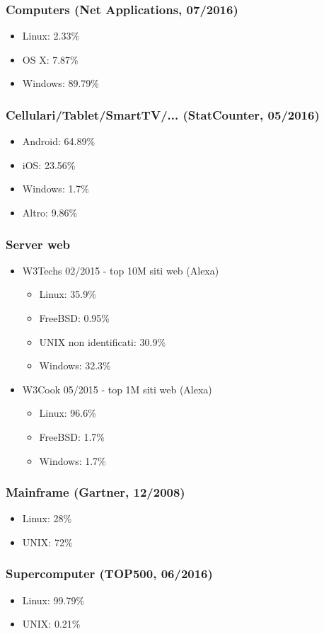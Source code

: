 \documentclass[t,aspectratio=169]{beamer}
\begin{document}
\begin{frame}
    \frametitle{Computers (Net Applications, 07/2016)}
    \begin{itemize}
        \item<2-> Linux: 2.33\%
        \item<2-> OS X: 7.87\%
        \item<2-> Windows: 89.79\%
    \end{itemize}
\end{frame}

\begin{frame}
    \frametitle{Cellulari/Tablet/SmartTV/... (StatCounter, 05/2016)}
    \begin{itemize}
        \item<2-> Android: 64.89\%
        \item<2-> iOS: 23.56\%
        \item<2-> Windows: 1.7\%
        \item<2-> Altro: 9.86\%
    \end{itemize}
\end{frame}

\begin{frame}
    \frametitle{Server web}
    \begin{itemize}
    \item<2-> W3Techs 02/2015 - top 10M siti web (Alexa)
        \begin{itemize}
            \item<3-> Linux: 35.9\%
            \item<3-> FreeBSD: 0.95\%
            \item<3-> UNIX non identificati: 30.9\%
            \item<3-> Windows: 32.3\%
        \end{itemize}
    \item<4-> W3Cook 05/2015 - top 1M siti web (Alexa)
        \begin{itemize}
            \item<5-> Linux: 96.6\%
            \item<5-> FreeBSD: 1.7\%
            \item<5-> Windows: 1.7\%
        \end{itemize}
    \end{itemize}
\end{frame}

\begin{frame}
    \frametitle{Mainframe (Gartner, 12/2008)}
    \begin{itemize}
        \item<2-> Linux: 28\%
        \item<2-> UNIX: 72\%
    \end{itemize}
\end{frame}

\begin{frame}
    \frametitle{Supercomputer (TOP500, 06/2016)}
    \begin{itemize}
        \item<2-> Linux: 99.79\%
        \item<2-> UNIX: 0.21\%
    \end{itemize}
\end{frame}

\makethanks
\end{document}
